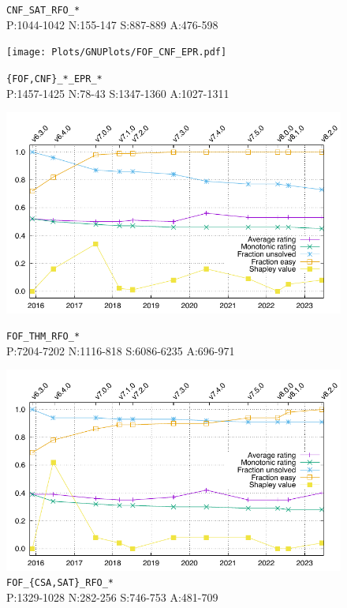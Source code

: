 \documentclass[runningheads]{llncs}
\begin{document}
\begin{figure}[b!]
\begin{minipage}[t]{.49\textwidth}
  \vspace*{-2em}
  \caption{{\tt CNF\_SAT\_RFO\_*} \\
           {\scriptsize P:1044-1042 N:155-147 S:887-889 A:476-598}}
  \label{Plot_CNF_SAT}
\end{minipage}
\begin{minipage}[t]{.49\textwidth}
  \centering
  \texttt{[image: Plots/GNUPlots/FOF\_CNF\_EPR.pdf]}
  \vspace*{-2em}
  \caption{{\tt \{FOF,CNF\}\_*\_EPR\_*} \\
           {\scriptsize P:1457-1425 N:78-43 S:1347-1360 A:1027-1311}}
  \label{Plot_FOF_CNF_EPR}
\end{minipage}
\begin{minipage}[t]{.49\textwidth}
  \centering
  \includegraphics[width=\textwidth]{Plots/GNUPlots/FOF_THM_RFO.pdf}
  \vspace*{-2em}
  \caption{{\tt FOF\_THM\_RFO\_*} \\
           {\scriptsize P:7204-7202 N:1116-818 S:6086-6235 A:696-971}}
  \label{Plot_FOF_THM_RFO}
\end{minipage}
\begin{minipage}[t]{.49\textwidth}
  \centering
  \includegraphics[width=\textwidth]{Plots/GNUPlots/FOF_CSA_SAT_RFO.pdf}
  \vspace*{-2em}
  \caption{{\tt FOF\_\{CSA,SAT\}\_RFO\_*} \\
           {\scriptsize P:1329-1028 N:282-256 S:746-753 A:481-709}}
  \label{Plot_FOF_CSA_SAT_RFO}
\end{minipage}
\end{figure}
\end{document}
